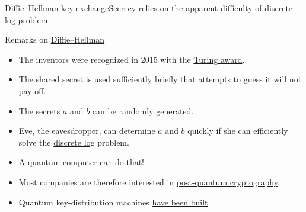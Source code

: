 \begin{frame}{\href{https://en.wikipedia.org/wiki/Diffie-Hellman_key_exchange}{Diffie--Hellman} key exchange}{Secrecy relies on the apparent difficulty of \href{https://en.wikipedia.org/wiki/Discrete_logarithm}{discrete log problem}}

\Vskip{-3em}\begin{ProtocolDialog}{0.28\textwidth}{0.33\textwidth}{0.37\textwidth}
\end{ProtocolDialog}
    
\end{frame}

\begin{frame}{Remarks on \href{https://en.wikipedia.org/wiki/Diffie-Hellman_key_exchange}{Diffie--Hellman}}
\begin{itemize}[<+->]
    \item The inventors were recognized in 2015 with the \href{https://awards.acm.org/about/2015-turing}{Turing award}.
    \item The shared secret is used sufficiently briefly that attempts to guess it will not pay off.
    \item The secrets $a$ and $b$ can be randomly generated.
    \item Eve, the eavesdropper, can determine $a$ and $b$ quickly if she can efficiently solve the \href{https://en.wikipedia.org/wiki/Discrete_logarithm}{discrete log} problem.
    \item A quantum computer can do that!
    \item Most companies are therefore interested in \href{https://en.wikipedia.org/wiki/Post-quantum_cryptography}{post-quantum cryptography}.
    \item Quantum key-distribution machines \href{https://en.wikipedia.org/wiki/Quantum_key_distribution\#Implementations}{have been built}.
\end{itemize}
\end{frame}


